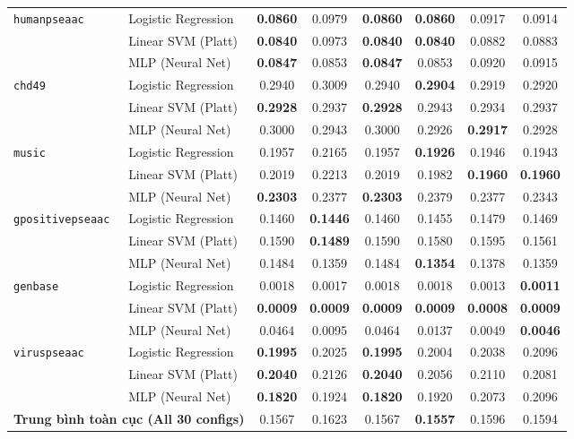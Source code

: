 \documentclass[10pt,a4paper,twoside]{article}
\begin{document}
\begin{table}[H]
{\begin{tabular}{llcccccc}
\midrule
\multirow{3}{*}{\texttt{humanpseaac}} & Logistic Regression & \textbf{0.0860} & 0.0979 & \textbf{0.0860} & \textbf{0.0860} & 0.0917 & 0.0914 \\
 & Linear SVM (Platt) & \textbf{0.0840} & 0.0973 & \textbf{0.0840} & \textbf{0.0840} & 0.0882 & 0.0883 \\
 & MLP (Neural Net) & \textbf{0.0847} & 0.0853 & \textbf{0.0847} & 0.0853 & 0.0920 & 0.0915 \\
\midrule
\multirow{3}{*}{\texttt{chd49}} & Logistic Regression & 0.2940 & 0.3009 & 0.2940 & \textbf{0.2904} & 0.2919 & 0.2920 \\
 & Linear SVM (Platt) & \textbf{0.2928} & 0.2937 & \textbf{0.2928} & 0.2943 & 0.2934 & 0.2937 \\
 & MLP (Neural Net) & 0.3000 & 0.2943 & 0.3000 & 0.2926 & \textbf{0.2917} & 0.2928 \\
\midrule
\multirow{3}{*}{\texttt{music}} & Logistic Regression & 0.1957 & 0.2165 & 0.1957 & \textbf{0.1926} & 0.1946 & 0.1943 \\
 & Linear SVM (Platt) & 0.2019 & 0.2213 & 0.2019 & 0.1982 & \textbf{0.1960} & \textbf{0.1960} \\
 & MLP (Neural Net) & \textbf{0.2303} & 0.2377 & \textbf{0.2303} & 0.2379 & 0.2377 & 0.2343 \\
\midrule
\multirow{3}{*}{\texttt{gpositivepseaac}} & Logistic Regression & 0.1460 & \textbf{0.1446} & 0.1460 & 0.1455 & 0.1479 & 0.1469 \\
 & Linear SVM (Platt) & 0.1590 & \textbf{0.1489} & 0.1590 & 0.1580 & 0.1595 & 0.1561 \\
 & MLP (Neural Net) & 0.1484 & 0.1359 & 0.1484 & \textbf{0.1354} & 0.1378 & 0.1359 \\
\midrule
\multirow{3}{*}{\texttt{genbase}} & Logistic Regression & 0.0018 & 0.0017 & 0.0018 & 0.0018 & 0.0013 & \textbf{0.0011} \\
 & Linear SVM (Platt) & \textbf{0.0009} & \textbf{0.0009} & \textbf{0.0009} & \textbf{0.0009} & \textbf{0.0008} & \textbf{0.0009} \\
 & MLP (Neural Net) & 0.0464 & 0.0095 & 0.0464 & 0.0137 & 0.0049 & \textbf{0.0046} \\
\midrule
\multirow{3}{*}{\texttt{viruspseaac}} & Logistic Regression & \textbf{0.1995} & 0.2025 & \textbf{0.1995} & 0.2004 & 0.2038 & 0.2096 \\
 & Linear SVM (Platt) & \textbf{0.2040} & 0.2126 & \textbf{0.2040} & 0.2056 & 0.2110 & 0.2081 \\
 & MLP (Neural Net) & \textbf{0.1820} & 0.1924 & \textbf{0.1820} & 0.1920 & 0.2073 & 0.2096 \\
\midrule
\multicolumn{2}{l}{\textbf{Trung bình toàn cục (All 30 configs)}} & 0.1567 & 0.1623 & 0.1567 & \textbf{0.1557} & 0.1596 & 0.1594 \\
\bottomrule
\end{tabular}%
}
\end{table}
\clearpage
\end{document}
